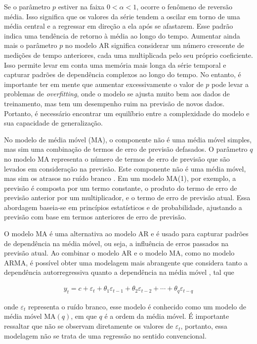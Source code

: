  Se o parâmetro $p$ estiver na faixa $0 < \alpha < 1$, ocorre o fenômeno de reversão média. Isso significa que os valores da série tendem a oscilar em torno de uma média central e a regressar em direção a ela após se afastarem. Esse padrão indica uma tendência de retorno à média ao longo do tempo. Aumentar ainda mais o parâmetro $p$ no modelo AR significa considerar um número crescente de medições de tempo anteriores, cada uma multiplicada pelo seu próprio coeficiente. Isso permite levar em conta uma memória mais longa da série temporal e capturar padrões de dependência complexos ao longo do tempo. No entanto, é importante ter em mente que aumentar excessivamente o valor de $p$ pode levar a problemas de \textit{overfitting}, onde o modelo se ajusta muito bem aos dados de treinamento, mas tem um desempenho ruim na previsão de novos dados. Portanto, é necessário encontrar um equilíbrio entre a complexidade do modelo e sua capacidade de generalização.
 
No modelo de média móvel (MA), o componente não é uma média móvel simples, mas sim uma combinação de termos de erro de previsão defasados. O parâmetro $q$ no modelo MA representa o número de termos de erro de previsão que são levados em consideração na previsão. Este componente não é uma média móvel, mas sim os atrasos no ruído branco \cite{signal}.
 Em um modelo MA(1), por exemplo, a previsão é composta por um termo constante, o produto do termo de erro de previsão anterior por um multiplicador, e o termo de erro de previsão atual. Essa abordagem baseia-se em princípios estatísticos e de probabilidade, ajustando a previsão com base em termos anteriores de erro de previsão.
 
 O modelo MA é uma alternativa ao modelo AR e é usado para capturar padrões de dependência na média móvel, ou seja, a influência de erros passados na previsão atual. Ao combinar o modelo AR e o modelo MA, como no modelo ARMA, é possível obter uma modelagem mais abrangente que considera tanto a dependência autorregressiva quanto a dependência na média móvel \cite{arima}, tal que
  
 \begin{eqnarray}
 	y_t=c+\varepsilon_t+\theta_1 \varepsilon_{t-1}+\theta_2 \varepsilon_{t-2}+\cdots+\theta_q \varepsilon_{t-q}\label{eq:ma}
 \end{eqnarray}
 
 \noindent onde $\varepsilon_t$ representa o ruído branco, esse modelo é conhecido como um modelo de média móvel MA$(q)$, em que $q$ é a ordem da média móvel. É importante ressaltar que não se observam diretamente os valores de $\varepsilon_t$, portanto, essa modelagem não se trata de uma regressão no sentido convencional.
 
